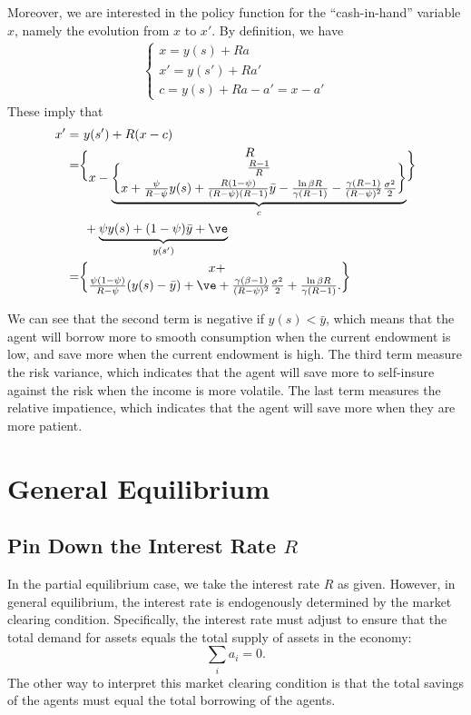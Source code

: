 Moreover, we are interested in the policy function for the ``cash-in-hand'' variable $x$, namely the evolution from $x$ to $x'$. By definition, we have
\[
\begin{aligned}
    \begin{cases}
    x = y(s) + Ra \\
    x' = y(s') + Ra'\\
    c = y(s)+Ra-a' = x - a'
\end{cases}
\end{aligned}
\]
These imply that
\[
\begin{aligned}
    x' = &\  y(s')+R(x-c)\\
= & \ R\brace{x- \underbrace{\frac{R-1}{R}\brace{x+\frac{\psi}{R-\psi}y(s)+\frac{R(1-\psi)}{(R-\psi)(R-1)}\bar y-\frac{\ln \beta R}{\gamma (R-1)}-\frac{\gamma (R-1)}{(R-\psi)^2}\frac{\sigma^2}{2}}}_c}\\
& \ + \underbrace{\psi y(s) + (1-\psi)\bar y + \ve}_{y(s')}\\
 = & \ x + \brace{\frac{\psi(1-\psi)}{R-\psi}(y(s)-\bar y)+\ve} +\frac{\gamma(\beta-1)}{(R-\psi)^2}\frac{\sigma^2}{2}+\frac{\ln \beta R}{\gamma (R-1)}.
\end{aligned}
\]

We can see that the second term is negative if $y(s)<\bar y$, which means that the agent will borrow more to smooth consumption when the current endowment is low, and save more when the current endowment is high. The third term measure the risk variance, which indicates that the agent will save more to self-insure against the risk when the income is more volatile. The last term measures the relative impatience, which indicates that the agent will save more when they are more patient.

\section{General Equilibrium}

\subsection{Pin Down the Interest Rate $R$}

In the partial equilibrium case, we take the interest rate $R$ as given. However, in general equilibrium, the interest rate is endogenously determined by the market clearing condition. Specifically, the interest rate must adjust to ensure that the total demand for assets equals the total supply of assets in the economy:
\[
\sum_ia_i = 0.
\]
The other way to interpret this market clearing condition is that the total savings of the agents must equal the total borrowing of the agents.

